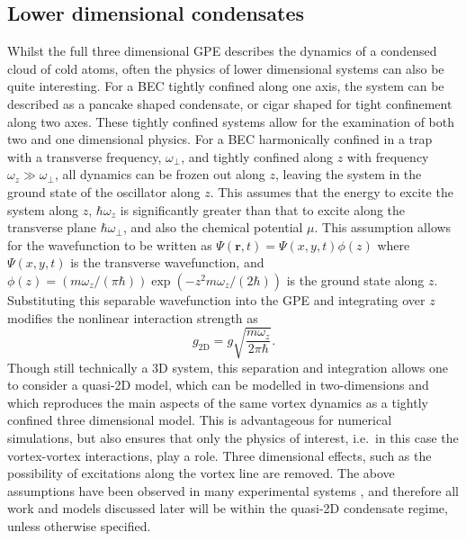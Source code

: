 \subsection{Lower dimensional condensates}\label{sub:coldatom_recent}
Whilst the full three dimensional GPE describes the dynamics of a condensed cloud of cold atoms, often the physics of lower dimensional systems can also be quite interesting. For a BEC tightly confined along one axis, the system can be described as a pancake shaped condensate, or cigar shaped for tight confinement along two axes. These tightly confined systems allow for the examination of both two and one dimensional physics. For a BEC harmonically confined in a trap with a transverse frequency, $\omega_\perp$, and tightly confined along $z$ with frequency $\omega_z \gg \omega_\perp$, all dynamics can be frozen out along $z$, leaving the system in the ground state of the oscillator along $z$. This assumes that the energy to excite the system along $z$, $\hbar\omega_z$ is significantly greater than that to excite along the transverse plane $\hbar\omega_\perp$, and also the chemical potential $\mu$. This assumption allows for the wavefunction to be written as $\Psi(\mathbf{r},t) = \Psi(x,y,t)\phi(z)$ where $\Psi(x,y,t)$ is the transverse wavefunction, and $\phi(z) = \left({m\omega_z/(\pi\hbar)}\right)\exp\left(-z^2{m\omega_z/(2\hbar)}\right)$ is the ground state along $z$.
Substituting this separable wavefunction into the GPE and integrating over $z$ modifies the nonlinear interaction strength as~\cite{BK:Pethick_Smith_2008}
\begin{equation}\label{eqn:g2d_efint}
    g_{\textrm{2D}} = g\sqrt{\frac{m\omega_z}{2\pi\hbar}}.
\end{equation}
Though still technically a 3D system, this separation and integration allows one to consider a quasi-2D model, which can be modelled in two-dimensions and which reproduces the main aspects of the same vortex dynamics as a tightly confined three dimensional model. This is advantageous for numerical simulations, but also ensures that only the physics of interest, i.e.\ in this case the vortex-vortex interactions, play a role. Three dimensional effects, such as the possibility of excitations along the vortex line are removed. The above assumptions have been observed in many experimental systems \cite{BEC:Gorlitz_prl_2001,BEC:Stock_prl_2005,Vtx:Neely_prl_2010,VTX:Kwon_pra_2014,BEC:Seo_jkps_2014,BEC:Chomaz_natcom_2015}, and therefore all work and models discussed later will be within the quasi-2D condensate regime, unless otherwise specified.
